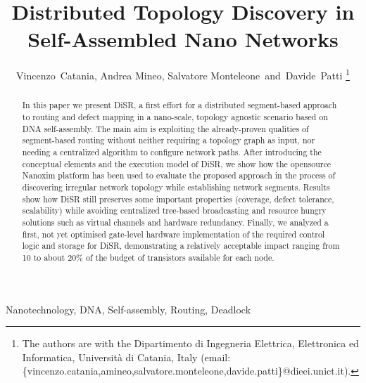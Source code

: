 \documentclass[final,journal]{IEEEtran}
\newcommand{\disr}{{\sf DiSR}}
\begin{document}

\title{Distributed Topology Discovery in Self-Assembled Nano Networks}

\author{Vincenzo~Catania, Andrea Mineo, Salvatore Monteleone~and~Davide~Patti%
\thanks{The authors are with the Dipartimento di Ingegneria
Elettrica, Elettronica ed Informatica, Universit\`a di Catania, Italy
(email: \{vincenzo.catania,amineo,salvatore.monteleone,davide.patti\}@dieei.unict.it).}}

\maketitle


\begin{abstract}
In this paper we present \disr{}, a first effort for a distributed
segment-based approach to routing and defect mapping in a nano-scale,
topology agnostic scenario based on DNA self-assembly. The main aim is
exploiting the already-proven qualities of segment-based routing
without neither requiring a topology graph as input, nor needing a
centralized algorithm to configure network paths.  After introducing
the conceptual elements and the execution model of \disr{}, we show how
the opensource Nanoxim platform has been used to evaluate the proposed
approach in the process of discovering irregular network topology
while establishing network segments.  Results show how \disr{} still
preserves some important properties (coverage, defect tolerance,
scalability)  while avoiding centralized tree-based broadcasting and
resource hungry solutions such as virtual channels and hardware
redundancy. Finally, we analyzed a first, not yet optimised gate-level
hardware implementation of the required control logic and storage for
\disr{}, demonstrating a relatively acceptable impact ranging from 10 to
about 20\% of the budget of transistors available for each node.
\end{abstract}


\begin{IEEEkeywords}
Nanotechnology, DNA, Self-assembly, Routing, Deadlock
\end{IEEEkeywords}
\end{document}
